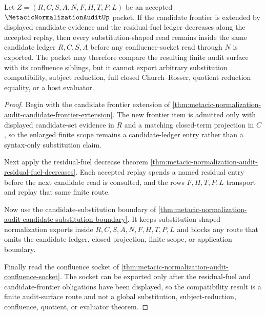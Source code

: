 \begin{theorem}
\label{thm:metacic-normalization-audit-residual-substitution-compatibility}
Let $Z=(R,C,S,A,N,F,H,T,P,L)$ be an accepted $\MetacicNormalizationAuditUp$ packet. If the candidate frontier is extended by displayed candidate evidence and the residual-fuel ledger decreases along the accepted replay, then every substitution-shaped read remains inside the same candidate ledger $R,C,S,A$ before any confluence-socket read through $N$ is exported. The packet may therefore compare the resulting finite audit surface with its confluence siblings, but it cannot export arbitrary substitution compatibility, subject reduction, full closed Church--Rosser, quotient reduction equality, or a host evaluator.
\end{theorem}
\begin{proof}
Begin with the candidate frontier extension of \autoref{thm:metacic-normalization-audit-candidate-frontier-extension}. The new frontier item is admitted only with displayed candidate-set evidence in $R$ and a matching closed-term projection in $C$, so the enlarged finite scope remains a candidate-ledger entry rather than a syntax-only substitution claim.

Next apply the residual-fuel decrease theorem \autoref{thm:metacic-normalization-audit-residual-fuel-decreases}. Each accepted replay spends a named residual entry before the next candidate read is consulted, and the rows $F,H,T,P,L$ transport and replay that same finite route.

Now use the candidate-substitution boundary of \autoref{thm:metacic-normalization-audit-candidate-substitution-boundary}. It keeps substitution-shaped normalization exports inside $R,C,S,A,N,F,H,T,P,L$ and blocks any route that omits the candidate ledger, closed projection, finite scope, or application boundary.

Finally read the confluence socket of \autoref{thm:metacic-normalization-audit-confluence-socket}. The socket can be exported only after the residual-fuel and candidate-frontier obligations have been displayed, so the compatibility result is a finite audit-surface route and not a global substitution, subject-reduction, confluence, quotient, or evaluator theorem.
\end{proof}

